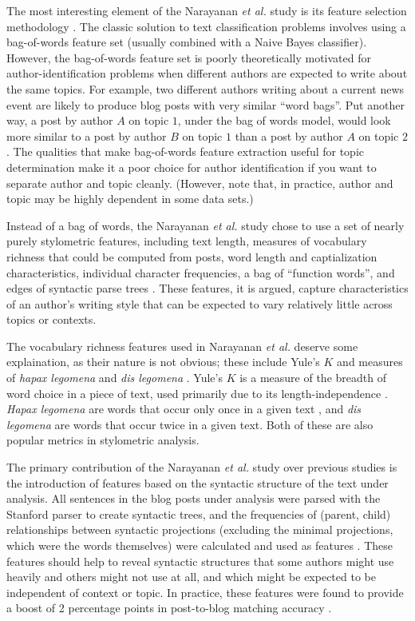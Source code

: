 \documentclass{article}
\begin{document}
The most interesting element of the Narayanan \textit{et al.} study is its feature selection methodology \cite{narayanan2012feasibility}. The classic solution to text classification problems involves using a bag-of-words feature set (usually combined with a Naive Bayes classifier). However, the bag-of-words feature set is poorly theoretically motivated for author-identification problems when different authors are expected to write about the same topics. For example, two different authors writing about a current news event are likely to produce blog posts with very similar ``word bags''. Put another way, a post by author $A$ on topic $1$, under the bag of words model, would look more similar to a post by author $B$ on topic $1$ than a post by author $A$ on topic $2$. The qualities that make bag-of-words feature extraction useful for topic determination make it a poor choice for author identification if you want to separate author and topic cleanly. (However, note that, in practice, author and topic may be highly dependent in some data sets.)

Instead of a bag of words, the Narayanan \textit{et al.} study chose to use a set of nearly purely stylometric features, including text length, measures of vocabulary richness that could be computed from posts, word length and captialization characteristics, individual character frequencies, a bag of ``function words'', and edges of syntactic parse trees \cite{narayanan2012feasibility}. These features, it is argued, capture characteristics of an author's writing style that can be expected to vary relatively little across topics or contexts.

The vocabulary richness features used in Narayanan \textit{et al.} deserve some explaination, as their nature is not obvious; these include Yule's $K$ and measures of \textit{hapax legomena} and \textit{dis legomena} \cite{narayanan2012feasibility}. Yule's $K$ is a measure of the breadth of word choice in a piece of text, used primarily due to its length-independence \cite{miranda2005yule}. \textit{Hapax legomena} are words that occur only once in a given text \cite{oxford2012oxford}, and \textit{dis legomena} are words that occur twice in a given text. Both of these are also popular metrics in stylometric analysis.

The primary contribution of the Narayanan \textit{et al.} study over previous studies \cite{abbasi2008writeprints} is the introduction of features based on the syntactic structure of the text under analysis. All sentences in the blog posts under analysis were parsed with the Stanford parser to create syntactic trees, and the frequencies of (parent, child) relationships between syntactic projections (excluding the minimal projections, which were the words themselves) were calculated and used as features \cite{klein2003accurate, narayanan2012feasibility}. These features should help to reveal syntactic structures that some authors might use heavily and others might not use at all, and which might be expected to be independent of context or topic. In practice, these features were found to provide a boost of 2 percentage points in post-to-blog matching accuracy \cite{narayanan2012feasibility}.
\end{document}

